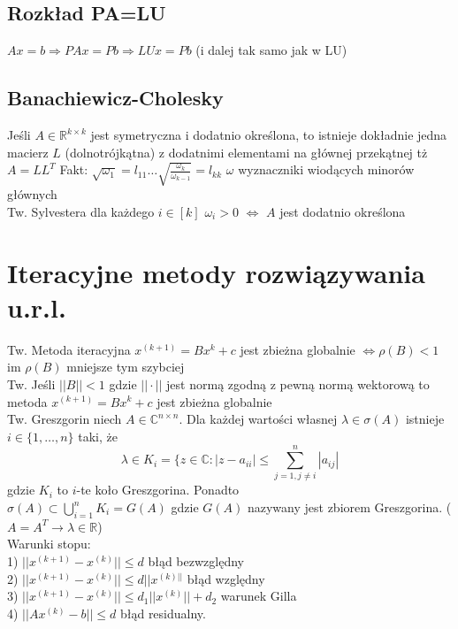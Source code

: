 \documentclass[twocolumn]{article}
\begin{document}
\begin{flushleft}
\subsection{Rozkład PA=LU}
$Ax=b \Rightarrow PAx=Pb \Rightarrow LUx=Pb$ (i dalej tak samo jak w LU)
\subsection{Banachiewicz-Cholesky}
Jeśli $A \in \mathbb{R}^{k\times k}$ jest symetryczna i dodatnio określona, to istnieje dokładnie jedna macierz $L$ (dolnotrójkątna) z dodatnimi elementami na głównej przekątnej tż $A=LL^T$
Fakt: $\sqrt{\omega_1} = l_{11} \ldots \sqrt{\frac{\omega_{k}}{\omega_{k-1}}} = l_{kk}$  $\omega$ wyznaczniki wiodących minorów głównych\\
Tw. Sylvestera dla każdego $i \in [k]$  $\omega_i > 0$ $\Leftrightarrow$ $A$ jest dodatnio określona 

\section{Iteracyjne metody rozwiązywania u.r.l.}
Tw. Metoda iteracyjna $x^{(k+1)} = Bx^k + c$ jest zbieżna globalnie $\Leftrightarrow \rho(B) < 1$\\ im $\rho(B)$ mniejsze tym szybciej\\
Tw. Jeśli $||B|| < 1$ gdzie $||\cdot||$ jest normą zgodną z pewną normą wektorową to metoda $x^{(k+1)}=Bx^k+c$ jest zbieżna globalnie\\
Tw. Greszgorin niech $A \in \mathbb{C}^{n \times n}$. Dla każdej wartości własnej $\lambda \in \sigma(A)$ istnieje $i \in \{1,\ldots,n\}$ taki, że
$$\lambda \in K_i = \{z \in \mathbb{C}:|z-a_{ii}| \leq \sum_{j=1,j \neq i}^{n} |a_{ij}|$$
gdzie $K_i$ to $i$-te koło Greszgorina. Ponadto\\
$\sigma(A) \subset \bigcup_{i=1}^nK_i = G(A)$ gdzie $G(A)$ nazywany jest zbiorem Greszgorina. ($A=A^T \rightarrow \lambda \in \mathbb{R}$)\\
Warunki stopu: \\ %
1) $||x^{(k+1)} - x^{(k)}|| \leq d$ błąd bezwzględny \\
2) $||x^{(k+1)} - x^{(k)}|| \leq d||x^{(k)||}$ błąd względny \\
3) $||x^{(k+1)} - x^{(k)}|| \leq d_1||x^{(k)}|| + d_2$ warunek Gilla\\
4) $||Ax^{(k)} -b || \leq d$ błąd residualny. \\


\end{flushleft}
\end{document}
